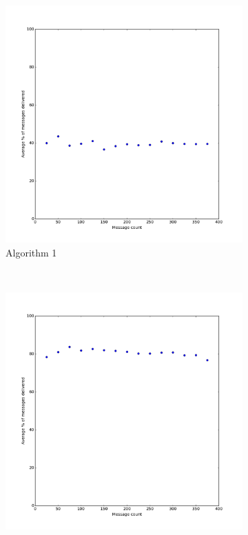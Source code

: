 \documentclass[bsc,frontabs,twoside,singlespacing,parskip,deptreport]{infthesis}     %
\begin{document}
\begin{figure}
  	\vspace{-15pt}
    \centering
    \begin{subfigure}[b]{0.3\textwidth}
        \includegraphics[width=\textwidth]{results/Prob50Share_Prob0}
        \caption{Algorithm 1}
        \label{fig:results/Prob50Share_Prob0}
    \end{subfigure}
    ~ %
    \begin{subfigure}[b]{0.3\textwidth}
        \includegraphics[width=\textwidth]{results/Prob50Share_Prob40}

\end{subfigure}
\end{figure}
\end{document}
